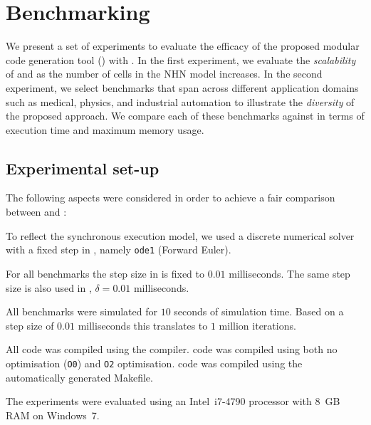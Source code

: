 \section{Benchmarking}
\label{sec:benchmarking}


We present a set of experiments to evaluate the efficacy of the proposed
modular code generation tool (\ourTool) with \simulink.  In the first 
experiment, we evaluate the \emph{scalability} of \ourTool and \simulink as the 
number of cells in the \ac{NHN} model increases.  In the second experiment, we 
select benchmarks that span across different application domains such as 
medical, physics, and industrial automation to illustrate the \emph{diversity} 
of the proposed approach.  We compare each of these benchmarks against 
\simulink in terms of execution time and maximum memory usage.  


\subsection{Experimental set-up}
\label{sec:experimentalSetUp}
The following aspects were considered in order to achieve a fair
comparison between \ourTool and \simulink:

\begin{description}
\item[\textbf{Solver}] To reflect the synchronous execution model, we
  used a discrete numerical solver with a fixed step in \simulink,
  namely \texttt{ode1} (Forward Euler).
  
\item[\textbf{Step Size}] For all benchmarks the step size in \simulink
  is fixed to $0.01$ milliseconds.  The same step size is also used in
  \ourTool, $\delta = 0.01$ milliseconds.
  
\item[\textbf{Time}] All benchmarks were simulated for $10$ seconds of
  simulation time.  Based on a step size of $0.01$ milliseconds this
  translates to $1$ million iterations.
  
\item[\textbf{Compiler}] All code was compiled using the \compiler
  compiler.  \ourTool code was compiled using both no optimisation
  (\texttt{O0}) and \texttt{O2} optimisation.  \simulink code was
  compiled using the automatically generated Makefile.
\end{description}

The experiments were evaluated using an Intel~i7-4790 processor with
8~GB RAM on Windows~7.


